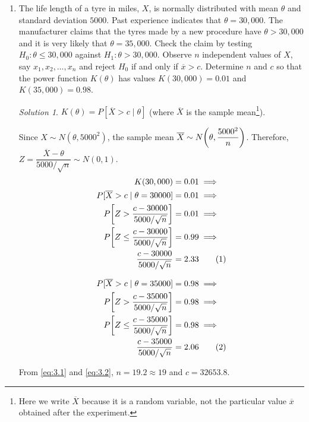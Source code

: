 \documentclass[svgnames, a5paper]{article}
\theoremstyle{definition}
\theoremstyle{remark}
\newtheorem*{Solution*}{Solution}
\begin{document}
\begin{enumerate}
\item The life length of a tyre in miles, $X$, is normally distributed with mean $\theta$ and standard deviation $5000$. Past experience indicates that $\theta = 30,000$. The manufacturer claims that the tyres made by a new procedure have $\theta > 30,000$ and it is very likely that $\theta = 35,000$. Check the claim by testing $H_0 \colon \theta \le 30,000$ against $H_1 \colon \theta > 30,000$. Observe $n$ independent values of $X$, say $x_1, x_2, \ldots, x_n$ and reject $H_0$ if and only if $\overline x > c$. Determine $n$ and $c$ so that the power function $K(\theta)$ has values $K(30,000) = 0.01$ and $K(35,000) = 0.98$.
\begin{Solution*}
$K(\theta) = P[\overline X > c \mid \theta]$ (where $\overline X$ is the sample mean\footnote{
	Here we write $\overline X$ because it is a random variable, not the particular value $\overline x$ obtained after the experiment.
}).

Since $X \sim N(\theta, 5000^2)$, the sample mean $\overline X \sim N \pqty{\theta, \dfrac{5000^2}n}$. Therefore, $Z = \dfrac{\overline X - \theta}{5000/\sqrt n} \sim N(0, 1)$.
\begin{align*}
K(30,000) & = 0.01 \implies \\
P[\overline X > c \mid \theta = 30000]	& = 0.01 \implies \\
P\bqty{ Z > \dfrac{c - 30000}{5000/\sqrt n} } & = 0.01 \implies \\
P\bqty{ Z \le \dfrac{c - 30000}{5000/\sqrt n} } & = 0.99 \implies \\
\dfrac{c - 30000}{5000/\sqrt n} & = 2.33 \tag{1} \label{eq:3.1}
\end{align*}

\begin{align*}
P[\overline X > c \mid \theta = 35000] & = 0.98 \implies \\
P\bqty{ Z > \dfrac{c - 35000}{5000/\sqrt n} } & = 0.98 \implies \\
P\bqty{ Z \le \dfrac{c - 35000}{5000/\sqrt n} } & = 0.98 \implies \\
\dfrac{c - 35000}{5000/\sqrt n} & = 2.06 \tag{2} \label{eq:3.2}
\end{align*}

From \eqref{eq:3.1} and \eqref{eq:3.2}, $n = 19.2 \approx 19$ and $c = 32653.8$.
\end{Solution*}
\end{enumerate}
\end{document}
